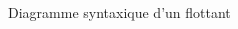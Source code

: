 \documentclass{report}
\begin{document}
\begin{multicols*}{3}
\begin{EExample}{Diagramme syntaxique d'un flottant}{}
\begin{adjustbox}{width=\linewidth}
\begin{tikzpicture}[shorten >=1pt, node distance=2cm, on grid, auto]
     \end{tikzpicture}
  \end{adjustbox}
\end{EExample}







  \end{multicols*}
\end{document}
